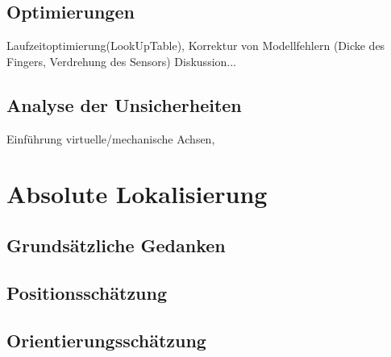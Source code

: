 \subsection{Optimierungen}
    Laufzeitoptimierung(LookUpTable), Korrektur von Modellfehlern (Dicke des Fingers, Verdrehung des Sensors)
    Diskussion...
	\subsection{Analyse der Unsicherheiten}
		Einführung virtuelle/mechanische Achsen,        

	\section{Absolute Lokalisierung}
		\subsection{Grundsätzliche Gedanken}
		\subsection{Positionsschätzung}
		\subsection{Orientierungsschätzung}
		

	
